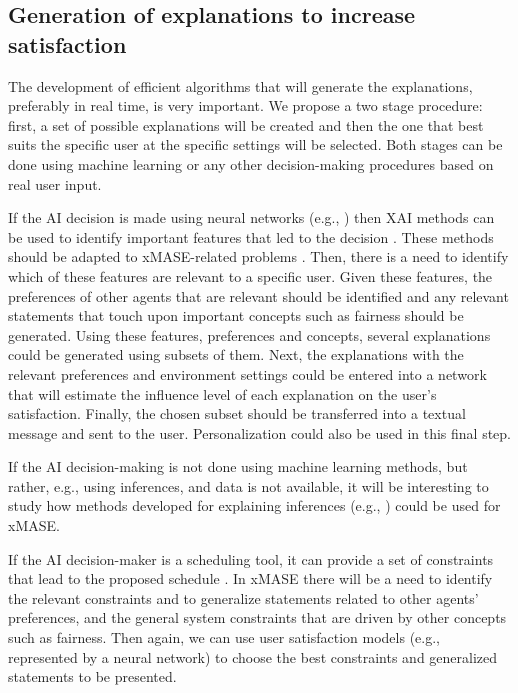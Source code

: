 \documentclass[letterpaper]{article} %
\begin{document}
\subsection{Generation of explanations to increase satisfaction} 
The development of efficient algorithms that will generate the explanations, preferably in real time, is very important. 
We propose a two stage procedure: first, a set of possible explanations will be created and then the one that best suits the specific user at the specific settings will be selected. Both stages can be done using machine learning or any other decision-making procedures based on real user input.

If the AI decision is made using neural networks (e.g., \cite{rosemarin2019emergency,li2019efficient}) then XAI methods can be used to identify important features that led to the decision
\cite{Shrikumar17,Bach15}. These methods should be adapted to \ac{xMASE}-related problems \cite{Lee19,Selvaraju17}.
Then, there is a need to identify which of these features are relevant to a specific user. Given these features, the preferences of other agents that are relevant should be identified and any relevant statements that touch upon important concepts such as  fairness should be generated.
Using these features, preferences and concepts, several explanations could be generated using subsets of them. Next, the explanations with the relevant preferences and environment settings could be entered into a network that will estimate the influence level of each explanation on the user's satisfaction. Finally, the chosen subset should be transferred into a textual message and sent to the user. Personalization could also be used in this final step.

If the AI decision-making is not done using machine learning methods, but rather, e.g., using inferences, and data is not available, it will be interesting to study how methods developed for explaining inferences (e.g.,  \cite{pino2003preferences}) could be used for \ac{xMASE}.

If the AI decision-maker is a scheduling tool, it can provide a set of constraints that lead to the proposed schedule \cite{ludwig2018explaining}. In \ac{xMASE} there will be a need to identify the relevant constraints and to generalize  statements related to other agents' preferences, and the general system constraints that are driven by other concepts such as fairness. Then again, we can use user satisfaction models (e.g., represented by a neural network) to choose the best constraints and generalized statements to be presented.
\end{document}
